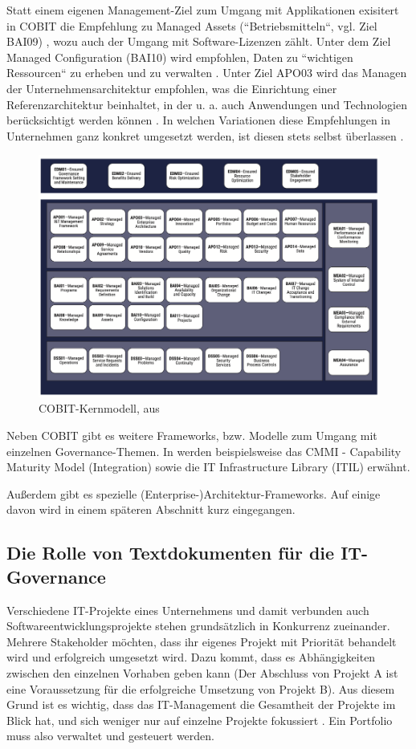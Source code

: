 Statt einem eigenen Management-Ziel zum Umgang mit Applikationen exisitert in COBIT die Empfehlung zu Managed Assets (``Betriebsmitteln``, vgl. Ziel BAI09) \cite[S. 209-214]{isaca1}, wozu auch der Umgang mit Software-Lizenzen zählt. Unter dem Ziel Managed Configuration (BAI10) wird empfohlen, Daten zu ``wichtigen Ressourcen`` zu erheben und zu verwalten \cite[S. 73]{gaulke}. Unter Ziel APO03 wird das Managen der Unternehmensarchitektur empfohlen, was die Einrichtung einer Referenzarchitektur beinhaltet, in der u. a. auch Anwendungen und Technologien berücksichtigt werden können \cite[S. 70]{gaulke}. In welchen Variationen diese Empfehlungen in Unternehmen ganz konkret umgesetzt werden, ist diesen stets selbst überlassen \cite[S. 65]{gaulke}.
 
\begin{figure}[h]
\centering
\includegraphics[scale=0.9]{content/pics/Picture_7.png}
\caption{COBIT-Kernmodell, aus \cite[S. 21]{isaca2}}
\label{Abbildung:isaca}
\end{figure}

Neben COBIT gibt es weitere Frameworks, bzw. Modelle zum Umgang mit einzelnen Governance-Themen. In \cite[S. 127-133]{gaulke} werden beispielsweise das CMMI - Capability Maturity Model (Integration) sowie die IT Infrastructure Library (ITIL) erwähnt. 
 
Außerdem gibt es spezielle (Enterprise-)Architektur-Frameworks. Auf einige davon wird in einem späteren Abschnitt kurz eingegangen. 

\subsection{Die Rolle von Textdokumenten für die IT-Governance}
Verschiedene IT-Projekte eines Unternehmens und damit verbunden auch Softwareentwicklungsprojekte stehen grundsätzlich in Konkurrenz zueinander. Mehrere Stakeholder möchten, dass ihr eigenes Projekt mit Priorität behandelt wird und erfolgreich umgesetzt wird. Dazu kommt, dass es Abhängigkeiten zwischen den einzelnen Vorhaben geben kann (Der Abschluss von Projekt A ist eine Voraussetzung für die erfolgreiche Umsetzung von Projekt B). Aus diesem Grund ist es wichtig, dass das IT-Management die Gesamtheit der Projekte im Blick hat, und sich weniger nur auf einzelne Projekte fokussiert \cite[S. 1]{frey}. Ein Portfolio muss also verwaltet und gesteuert werden.

